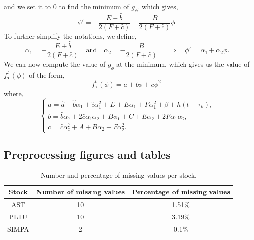 \documentclass[11pt]{article}
\begin{document}
and we set it to $0$ to find the minimum of $g_\phi$, which gives,
\begin{equation*}
    \phi' = -\frac{E + \hat{b}}{2(F+\hat{c})} - \frac{B}{2(F+\hat{c})}\phi.
\end{equation*}
To further simplify the notations, we define,
\begin{equation*}
        \alpha_1 = -\frac{E + \hat{b}}{2(F+\hat{c})} \quad \text{and} \quad \alpha_2 = - \frac{B}{2(F+\hat{c})} \quad \implies \quad \phi' = \alpha_1 + \alpha_2\phi.
\end{equation*}
We can now compute the value of $g_\phi$ at the minimum, which gives us the value of $f_{\boldsymbol{\tau}}^t(\phi)$ of the form,
$$ f_{\boldsymbol{\tau}}^t(\phi) = a + b\phi + c\phi^2. $$
where,
\begin{equation*}
    \begin{cases}
        a = \hat{a} + \hat{b}\alpha_1 + \hat{c}\alpha_1^2 + D + E\alpha_1 + F\alpha_1^2 + \beta + h(t-\tau_k), \\
        b = \hat{b}\alpha_2 + 2\hat{c}\alpha_1\alpha_2 + B\alpha_1 + C + E\alpha_2 + 2F\alpha_1\alpha_2, \\
        c = \hat{c}\alpha_2^2 + A + B\alpha_2 + F\alpha_2^2.
    \end{cases}
\end{equation*}
\subsection{Preprocessing figures and tables}

\begin{table}[H]
    \centering
    \begin{tabular}{|c|c|c|}
        \hline
        Stock & Number of missing values & Percentage of missing values \\
        \hline
        AST   & 10                       & 1.51\%                       \\
        PLTU  & 10                       & 3.19\%                       \\
        SIMPA & 2                        & 0.1\%                        \\
        \hline
    \end{tabular}
    \caption{Number and percentage of missing values per stock.}
    \label{tab:missing_values}
\end{table}
\end{document}
